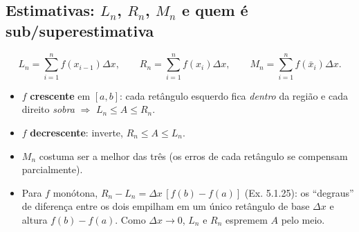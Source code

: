 \subsection{Estimativas: $L_n$, $R_n$, $M_n$ e quem é sub/superestimativa}

\[
L_n=\sum_{i=1}^n f(x_{i-1})\Delta x,\qquad
R_n=\sum_{i=1}^n f(x_i)\Delta x,\qquad
M_n=\sum_{i=1}^n f(\bar x_i)\Delta x .
\]

\begin{geo}
\begin{itemize}[leftmargin=1.4em, itemsep=1pt]
\item $f$ \textbf{crescente} em $[a,b]$: cada retângulo esquerdo fica \emph{dentro} da região e cada direito \emph{sobra} $\Rightarrow$ $L_n\le A\le R_n$.
\item $f$ \textbf{decrescente}: inverte, $R_n\le A\le L_n$.
\item $M_n$ costuma ser a melhor das três (os erros de cada retângulo se compensam parcialmente).
\item Para $f$ monótona, $R_n-L_n=\Delta x\,[f(b)-f(a)]$ (Ex. 5.1.25): os ``degraus'' de diferença entre os dois empilham em um único retângulo de base $\Delta x$ e altura $f(b)-f(a)$. Como $\Delta x\to 0$, $L_n$ e $R_n$ espremem $A$ pelo meio.
\end{itemize}
\end{geo}

